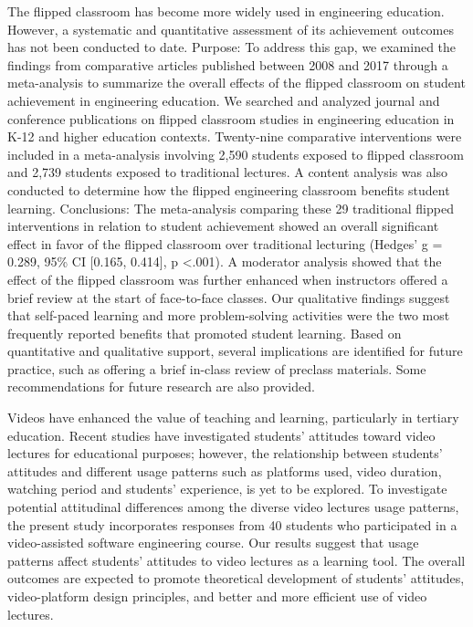 The flipped classroom has become more widely used in engineering education. However, a systematic and quantitative assessment of its achievement outcomes has not been conducted to date. Purpose: To address this gap, we examined the findings from comparative articles published between 2008 and 2017 through a meta-analysis to summarize the overall effects of the flipped classroom on student achievement in engineering education. We searched and analyzed journal and conference publications on flipped classroom studies in engineering education in K-12 and higher education contexts. Twenty-nine comparative interventions were included in a meta-analysis involving 2,590 students exposed to flipped classroom and 2,739 students exposed to traditional lectures. A content analysis was also conducted to determine how the flipped engineering classroom benefits student learning. Conclusions: The meta-analysis comparing these 29 traditional flipped interventions in relation to student achievement showed an overall significant effect in favor of the flipped classroom over traditional lecturing (Hedges' g = 0.289, 95\% CI [0.165, 0.414], p <.001). A moderator analysis showed that the effect of the flipped classroom was further enhanced when instructors offered a brief review at the start of face-to-face classes. Our qualitative findings suggest that self-paced learning and more problem-solving activities were the two most frequently reported benefits that promoted student learning. Based on quantitative and qualitative support, several implications are identified for future practice, such as offering a brief in-class review of preclass materials. Some recommendations for future research are also provided.\cite{Lo2019}


Videos have enhanced the value of teaching and learning, particularly in tertiary education. Recent studies have investigated students' attitudes toward video lectures for educational purposes; however, the relationship between students' attitudes and different usage patterns such as platforms used, video duration, watching period and students' experience, is yet to be explored. To investigate potential attitudinal differences among the diverse video lectures usage patterns, the present study incorporates responses from 40 students who participated in a video-assisted software engineering course. Our results suggest that usage patterns affect students' attitudes to video lectures as a learning tool. The overall outcomes are expected to promote theoretical development of students' attitudes, video-platform design principles, and better and more efficient use of video lectures.\cite{Giannakos2016}